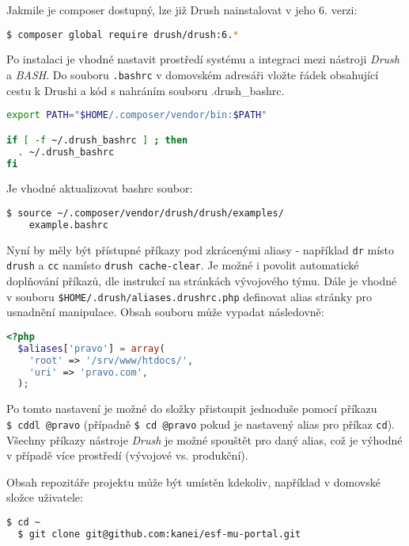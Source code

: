 Jakmile je composer dostupný, lze již Drush nainstalovat v jeho 6. verzi:

\begin{lstlisting}[language=bash]
  $ composer global require drush/drush:6.*
\end{lstlisting}

Po instalaci je vhodné nastavit prostředí systému a integraci mezi nástroji \emph{Drush} a \emph{BASH}. Do souboru \texttt{.bashrc} v domovském adresáři vložte řádek obsahující cestu k Drushi a kód s nahráním souboru .drush\_bashrc.

\begin{lstlisting}[language=bash]
export PATH="$HOME/.composer/vendor/bin:$PATH"

if [ -f ~/.drush_bashrc ] ; then
  . ~/.drush_bashrc
fi
\end{lstlisting} 

Je vhodné aktualizovat bashrc soubor:

\begin{lstlisting}[language=bash]
  $ source ~/.composer/vendor/drush/drush/examples/
    example.bashrc
\end{lstlisting} 

Nyní by měly být přístupné příkazy pod zkrácenými aliasy - například \texttt{dr} místo \texttt{drush} a \texttt{cc} namísto \texttt{drush cache-clear}. Je možné i povolit automatické doplňování příkazů, dle instrukcí na stránkách vývojového týmu. Dále je vhodné v souboru \linebreak\texttt{\$HOME/.drush/aliases.drushrc.php} definovat alias stránky pro usnadnění manipulace. Obsah souboru může vypadat následovně:

\begin{lstlisting}[language=php]
  <?php
  $aliases['pravo'] = array(
    'root' => '/srv/www/htdocs/',
    'uri' => 'pravo.com',
  );
\end{lstlisting}

Po tomto nastavení je možné do složky přistoupit jednoduše pomocí příkazu \texttt{\$~cddl~@pravo} (případně \texttt{\$~cd~@pravo} pokud je nastavený alias pro příkaz \texttt{cd}). Všechny příkazy nástroje \emph{Drush} je možné spouštět pro daný alias, což je výhodné v případě více prostředí (vývojové vs. produkční).

Obsah repozitáře projektu může být umístěn kdekoliv, například v domovské složce uživatele:

\begin{lstlisting}[language=bash]
  $ cd ~
  $ git clone git@github.com:kanei/esf-mu-portal.git  
\end{lstlisting}

